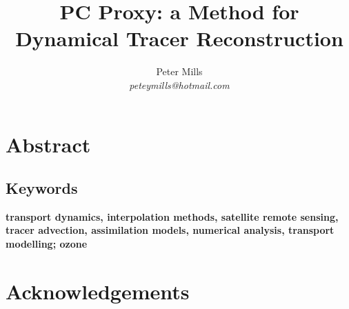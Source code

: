 \documentclass{article}
\begin{document}
\newcommand{\vect}[1]{\ensuremath{\vec #1}}
\newcommand{\italics}[1]{{\it #1}}

\title{PC Proxy: a Method for Dynamical Tracer Reconstruction}

\author{Peter Mills\\\textit{peteymills@hotmail.com}}

\maketitle

\pagestyle{myheadings}

\section*{Abstract}



\subsection*{Keywords}
\textbf{transport dynamics, interpolation methods, satellite remote sensing, tracer advection, assimilation models, numerical analysis, transport modelling; ozone}

\pagebreak

\tableofcontents



\section{Acknowledgements}






\appendix


\end{document}
